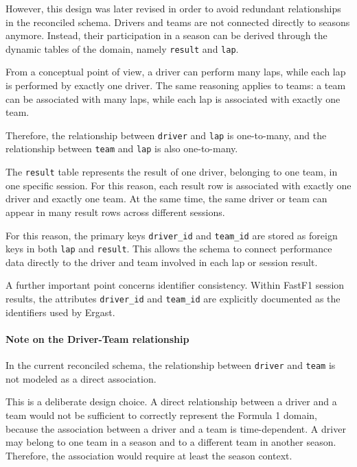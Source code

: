 \documentclass[12pt,a4paper]{article}
\begin{document}
	However, this design was later revised in order to avoid redundant relationships in the
	reconciled schema. Drivers and teams are not connected directly to seasons anymore.
	Instead, their participation in a season can be derived through the dynamic tables of the
	domain, namely \texttt{result} and \texttt{lap}.
	
	From a conceptual point of view, a driver can perform many laps, while each lap is
	performed by exactly one driver. The same reasoning applies to teams: a team can be
	associated with many laps, while each lap is associated with exactly one team.
	
	Therefore, the relationship between \texttt{driver} and \texttt{lap} is one-to-many, and the
	relationship between \texttt{team} and \texttt{lap} is also one-to-many.
	
	The \texttt{result} table represents the result of one driver, belonging to one team, in one
	specific session. For this reason, each result row is associated with exactly one driver and
	exactly one team. At the same time, the same driver or team can appear in many result
	rows across different sessions.
	
	For this reason, the primary keys \texttt{driver\_id} and \texttt{team\_id} are stored as foreign
	keys in both \texttt{lap} and \texttt{result}. This allows the schema to connect performance
	data directly to the driver and team involved in each lap or session result.
	

	
	A further important point concerns identifier consistency.
	Within FastF1 session results, the attributes \texttt{driver\_id} and \texttt{team\_id} are explicitly documented as the identifiers used by Ergast.

	
	\paragraph{Note on the Driver-Team relationship}
	
	In the current reconciled schema, the relationship between \texttt{driver} and
	\texttt{team} is not modeled as a direct association.
	
	This is a deliberate design choice. A direct relationship between a driver and a team
	would not be sufficient to correctly represent the Formula 1 domain, because the
	association between a driver and a team is time-dependent. A driver may belong to one
	team in a season and to a different team in another season. Therefore, the association
	would require at least the season context.
	
\end{document}
